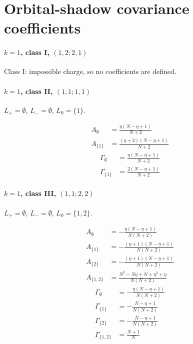 \documentclass[11pt]{article}
\begin{document}
\section*{Orbital-shadow covariance coefficients}

\paragraph{$k=1$, class I, $(1,2;2,1)$}
Class I: impossible charge, so no coefficients are defined.


\paragraph{$k=1$, class II, $(1,1;1,1)$}

$L_+=\emptyset$, $L_-=\emptyset$, $L_0=\{1\}$.

\begin{align*}
  A_{\emptyset} &= \frac{\eta \left(N - \eta + 1\right)}{N + 2} \\
  A_{\{1\}} &= \frac{\left(\eta + 2\right) \left(N - \eta + 1\right)}{N + 2} 
\end{align*}
\begin{align*}
  \Gamma_{\emptyset} &= \frac{\eta \left(N - \eta + 1\right)}{N + 2} \\
  \Gamma_{\{1\}} &= \frac{2 \left(N - \eta + 1\right)}{N + 2} 
\end{align*}

\paragraph{$k=1$, class III, $(1,1;2,2)$}

$L_+=\emptyset$, $L_-=\emptyset$, $L_0=\{1,2\}$.

\begin{align*}
  A_{\emptyset} &= - \frac{\eta \left(N - \eta + 1\right)}{N \left(N + 2\right)} \\
  A_{\{1\}} &= - \frac{\left(\eta + 1\right) \left(N - \eta + 1\right)}{N \left(N + 2\right)} \\
  A_{\{2\}} &= - \frac{\left(\eta + 1\right) \left(N - \eta + 1\right)}{N \left(N + 2\right)} \\
  A_{\{1,2\}} &= \frac{N^{2} - N \eta + N + \eta^{2} + \eta}{N \left(N + 2\right)} 
\end{align*}
\begin{align*}
  \Gamma_{\emptyset} &= - \frac{\eta \left(N - \eta + 1\right)}{N \left(N + 2\right)} \\
  \Gamma_{\{1\}} &= - \frac{N - \eta + 1}{N \left(N + 2\right)} \\
  \Gamma_{\{2\}} &= - \frac{N - \eta + 1}{N \left(N + 2\right)} \\
  \Gamma_{\{1,2\}} &= \frac{N + 1}{N} 
\end{align*}
\end{document}
